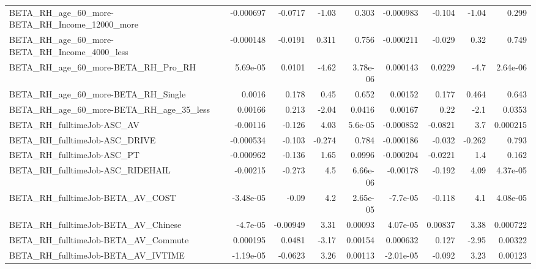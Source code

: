 \begin{tabular}{lrrrrrrrr}
BETA\_RH\_age\_60\_more-BETA\_RH\_Income\_12000\_more      &   -0.000697 &      -0.0717 &     -1.03 &    0.303 &  -0.000983 &      -0.104 &        -1.04 &         0.299 \\
BETA\_RH\_age\_60\_more-BETA\_RH\_Income\_4000\_less       &   -0.000148 &      -0.0191 &     0.311 &    0.756 &  -0.000211 &      -0.029 &         0.32 &         0.749 \\
BETA\_RH\_age\_60\_more-BETA\_RH\_Pro\_RH                 &    5.69e-05 &       0.0101 &     -4.62 & 3.78e-06 &   0.000143 &      0.0229 &         -4.7 &      2.64e-06 \\
BETA\_RH\_age\_60\_more-BETA\_RH\_Single                 &      0.0016 &        0.178 &      0.45 &    0.652 &    0.00152 &       0.177 &        0.464 &         0.643 \\
BETA\_RH\_age\_60\_more-BETA\_RH\_age\_35\_less            &     0.00166 &        0.213 &     -2.04 &   0.0416 &    0.00167 &        0.22 &         -2.1 &        0.0353 \\
BETA\_RH\_fulltimeJob-ASC\_AV                         &    -0.00116 &       -0.126 &      4.03 &  5.6e-05 &  -0.000852 &     -0.0821 &          3.7 &      0.000215 \\
BETA\_RH\_fulltimeJob-ASC\_DRIVE                      &   -0.000534 &       -0.103 &    -0.274 &    0.784 &  -0.000186 &      -0.032 &       -0.262 &         0.793 \\
BETA\_RH\_fulltimeJob-ASC\_PT                         &   -0.000962 &       -0.136 &      1.65 &   0.0996 &  -0.000204 &     -0.0221 &          1.4 &         0.162 \\
BETA\_RH\_fulltimeJob-ASC\_RIDEHAIL                   &    -0.00215 &       -0.273 &       4.5 & 6.66e-06 &   -0.00178 &      -0.192 &         4.09 &      4.37e-05 \\
BETA\_RH\_fulltimeJob-BETA\_AV\_COST                   &   -3.48e-05 &        -0.09 &       4.2 & 2.65e-05 &   -7.7e-05 &      -0.118 &          4.1 &      4.08e-05 \\
BETA\_RH\_fulltimeJob-BETA\_AV\_Chinese                &    -4.7e-05 &     -0.00949 &      3.31 &  0.00093 &   4.07e-05 &     0.00837 &         3.38 &      0.000722 \\
BETA\_RH\_fulltimeJob-BETA\_AV\_Commute                &    0.000195 &       0.0481 &     -3.17 &  0.00154 &   0.000632 &       0.127 &        -2.95 &       0.00322 \\
BETA\_RH\_fulltimeJob-BETA\_AV\_IVTIME                 &   -1.19e-05 &      -0.0623 &      3.26 &  0.00113 &  -2.01e-05 &      -0.092 &         3.23 &       0.00123 \\

\end{tabular}
